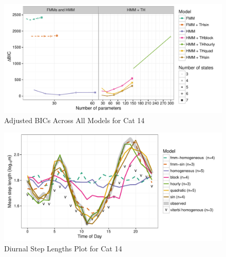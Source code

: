 \documentclass{article}\usepackage[]{graphicx}\usepackage{xcolor}
\makeatletter
\def\maxwidth{ %
  \ifdim\Gin@nat@width>\linewidth
    \linewidth
  \else
    \Gin@nat@width
  \fi
}
\newenvironment{knitrout}{}{} %
\makeatother
\begin{document}
\clearpage

\begin{knitrout}
\color{fgcolor}\begin{figure}
\includegraphics[width=\maxwidth]{figure/adj_BIC_comparisons14-1} \caption[Adjusted BICs Across All Models for Cat 14]{Adjusted BICs Across All Models for Cat 14}\label{fig:adj_BIC_comparisons14}
\end{figure}


\end{knitrout}

\clearpage

\begin{knitrout}
\color{fgcolor}\begin{figure}
\includegraphics[width=\maxwidth]{figure/avg_step_length_by_time14-1} \caption[Diurnal Step Lengths Plot for Cat 14]{Diurnal Step Lengths Plot for Cat 14}\label{fig:avg_step_length_by_time14}
\end{figure}


\end{knitrout}

\clearpage
\end{document}

